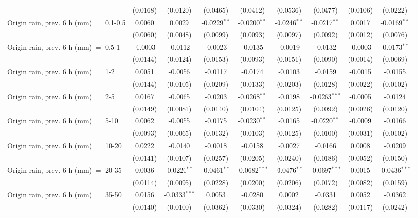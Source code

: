 \begin{tabular}{lcccccccc}
    & (0.0168) & (0.0120) & (0.0465) & (0.0412) & (0.0536) & (0.0477) & (0.0106) & (0.0222)\\
   Origin rain, prev. 6 h (mm) $=$ 0.1-0.5 & 0.0060 & 0.0029 & -0.0229$^{**}$ & -0.0200$^{**}$ & -0.0246$^{**}$ & -0.0217$^{**}$ & 0.0017 & -0.0169$^{**}$\\
    & (0.0060) & (0.0048) & (0.0099) & (0.0093) & (0.0097) & (0.0092) & (0.0012) & (0.0076)\\
   Origin rain, prev. 6 h (mm) $=$ 0.5-1 & -0.0003 & -0.0112 & -0.0023 & -0.0135 & -0.0019 & -0.0132 & -0.0003 & -0.0173$^{**}$\\
    & (0.0144) & (0.0124) & (0.0153) & (0.0093) & (0.0151) & (0.0090) & (0.0014) & (0.0069)\\
   Origin rain, prev. 6 h (mm) $=$ 1-2 & 0.0051 & -0.0056 & -0.0117 & -0.0174 & -0.0103 & -0.0159 & -0.0015 & -0.0155\\
    & (0.0144) & (0.0105) & (0.0209) & (0.0133) & (0.0203) & (0.0128) & (0.0022) & (0.0102)\\
   Origin rain, prev. 6 h (mm) $=$ 2-5 & 0.0167 & -0.0065 & -0.0203 & -0.0268$^{**}$ & -0.0198 & -0.0263$^{***}$ & -0.0005 & -0.0124\\
    & (0.0149) & (0.0081) & (0.0140) & (0.0104) & (0.0125) & (0.0092) & (0.0026) & (0.0120)\\
   Origin rain, prev. 6 h (mm) $=$ 5-10 & 0.0062 & -0.0055 & -0.0175 & -0.0230$^{**}$ & -0.0165 & -0.0220$^{**}$ & -0.0009 & -0.0166\\
    & (0.0093) & (0.0065) & (0.0132) & (0.0103) & (0.0125) & (0.0100) & (0.0031) & (0.0102)\\
   Origin rain, prev. 6 h (mm) $=$ 10-20 & 0.0222 & -0.0140 & -0.0018 & -0.0158 & -0.0027 & -0.0166 & 0.0008 & -0.0209\\
    & (0.0141) & (0.0107) & (0.0257) & (0.0205) & (0.0240) & (0.0186) & (0.0052) & (0.0150)\\
   Origin rain, prev. 6 h (mm) $=$ 20-35 & 0.0036 & -0.0220$^{**}$ & -0.0461$^{**}$ & -0.0682$^{***}$ & -0.0476$^{**}$ & -0.0697$^{***}$ & 0.0015 & -0.0436$^{***}$\\
    & (0.0114) & (0.0095) & (0.0228) & (0.0200) & (0.0206) & (0.0172) & (0.0082) & (0.0159)\\
   Origin rain, prev. 6 h (mm) $=$ 35-50 & 0.0156 & -0.0333$^{***}$ & 0.0053 & -0.0280 & 0.0002 & -0.0331 & 0.0052 & -0.0362\\
    & (0.0140) & (0.0100) & (0.0362) & (0.0330) & (0.0324) & (0.0282) & (0.0117) & (0.0242)\\

\end{tabular}
